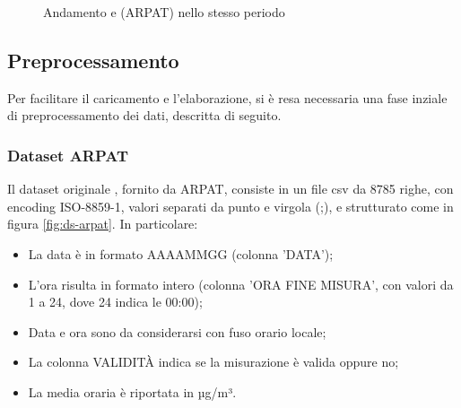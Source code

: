 \begin{figure}[H]%
    \centering
    \captionsetup{justification=centering}
    \caption{Andamento  e  (ARPAT) nello stesso periodo}%
    \label{fig:arpat-pm}%
\end{figure}

\subsection{Preprocessamento}\label{ssec:preprocessamento}
Per facilitare il caricamento e l'elaborazione, si è resa necessaria una fase inziale di preprocessamento dei dati, descritta di seguito.

\subsubsection{Dataset ARPAT }
Il dataset originale , fornito da ARPAT, consiste in un file csv da 8785 righe, con encoding ISO-8859-1, valori separati da punto e virgola (;), e strutturato come in figura \ref{fig:ds-arpat}. In particolare:
\begin{itemize}
  \item La data è in formato AAAAMMGG (colonna 'DATA');
  \item L'ora risulta in formato intero (colonna 'ORA FINE MISURA', con valori da 1 a 24, dove 24 indica le 00:00);
  \item Data e ora sono da considerarsi con fuso orario locale;
  \item La colonna VALIDITÀ indica se la misurazione è valida oppure no;
  \item La media oraria è riportata in µg/m³.
\end{itemize}

